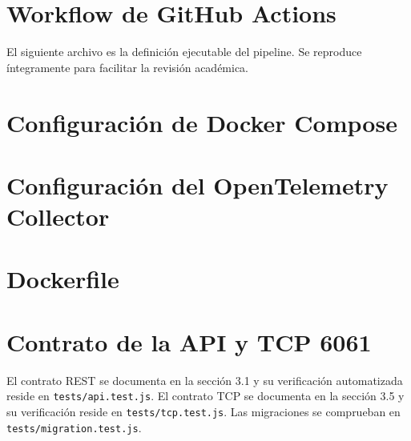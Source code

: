 \documentclass[12pt,a4paper]{article}
\begin{document}
\section{Workflow de GitHub Actions}
El siguiente archivo es la definición ejecutable del pipeline. Se reproduce íntegramente para facilitar la revisión académica.



\section{Configuración de Docker Compose}


\section{Configuración del OpenTelemetry Collector}


\section{Dockerfile}


\section{Contrato de la API y TCP 6061}
El contrato REST se documenta en la sección 3.1 y su verificación automatizada reside en \texttt{tests/api.test.js}. El contrato TCP se documenta en la sección 3.5 y su verificación reside en \texttt{tests/tcp.test.js}. Las migraciones se comprueban en \texttt{tests/migration.test.js}.
\end{document}
